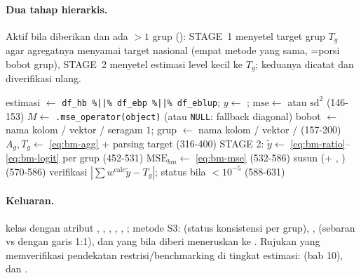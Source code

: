 \paragraph{Dua tahap hierarkis.} Aktif bila  diberikan
dan ada $>1$ grup (): STAGE~1 menyetel target grup
$T_g$ agar agregatnya menyamai target nasional (empat metode yang sama,
=porsi bobot grup), STAGE~2 menyetel estimasi level kecil ke
$T_g$; keduanya dicatat  dan diverifikasi ulang.
\begin{algorithm}[htbp]
\caption{\texttt{benchmark\_sae} --- alur sebenarnya (\texttt{R/benchmark.R:120-633})}\label{alg:bm}
estimasi $\leftarrow$ \texttt{df\_hb \%||\% df\_ebp \%||\% df\_eblup};
  $y\leftarrow$ ; $\mathrm{mse}\leftarrow$  atau $\mathrm{sd}^2$ (146-153)\;
$M\leftarrow$ \texttt{.mse\_operator(object)} (atau \texttt{NULL}: fallback diagonal)\;
bobot $\leftarrow$ nama kolom / vektor / seragam $1$; grup $\leftarrow$ nama kolom / vektor /  (157-200)\;
$A_g,T_g\leftarrow$ \eqref{eq:bm-agg} + parsing target (316-400)\;
STAGE 2: $\tilde y\leftarrow$ \eqref{eq:bm-ratio}--\eqref{eq:bm-logit} per grup (452-531)\;
$\mathrm{MSE}_{bm}\leftarrow$ \eqref{eq:bm-mse} (532-586)\;
susun  (+ , ) (570-586)\;
verifikasi $|\sum w^{\text{calc}}\tilde y-T_g|$; status  bila $<10^{-5}$ (588-631)\;
\end{algorithm}

\paragraph{Keluaran.}  kelas 
dengan atribut , , ,
, , ;
metode S3:  (status konsistensi per grup), ,
 (sebaran  vs  dengan garis 1:1),
dan  yang bila diberi  meneruskan ke .
Rujukan yang memverifikasi pendekatan restrisi/benchmarking di tingkat
estimasi: \citet{rao2015small} (bab 10), \citet{you2002pseudo} dan
\citet{wang2008small}.


